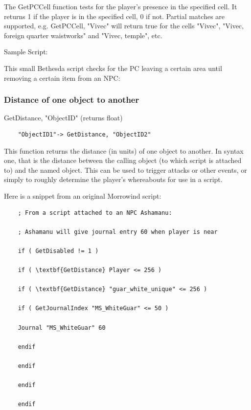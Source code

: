 The GetPCCell function tests for the player's presence in the specified
cell. It returns 1 if the player is in the specified cell, 0 if not.
Partial matches are supported, e.g. GetPCCell, "Vivec" will return true
for the cells "Vivec", "Vivec, foreign quarter waistworks" and "Vivec,
temple", etc.

Sample Script:

This small Bethesda script checks for the PC leaving a certain area
until removing a certain item from an NPC:



\hypertarget{distance-of-one-object-to-another}{%
\subsubsection{Distance of one object to
another}\label{distance-of-one-object-to-another}}

GetDistance, "ObjectID" (returns float)

\begin{lstlisting}
	"ObjectID1"-> GetDistance, "ObjectID2"
\end{lstlisting}

This function returns the distance (in units) of one object to another.
In syntax one, that is the distance between the calling object (to which
script is attached to) and the named object. This can be used to trigger
attacks or other events, or simply to roughly determine the player's
whereabouts for use in a script.

Here is a snippet from an original Morrowind script:

\begin{lstlisting}
	; From a script attached to an NPC Ashamanu:
	
	; Ashamanu will give journal entry 60 when player is near
	
	if ( GetDisabled != 1 )
	
	if ( \textbf{GetDistance} Player <= 256 )
	
	if ( \textbf{GetDistance} "guar_white_unique" <= 256 )
	
	if ( GetJournalIndex "MS_WhiteGuar" <= 50 )
	
	Journal "MS_WhiteGuar" 60
	
	endif
	
	endif
	
	endif
	
	endif
\end{lstlisting}

